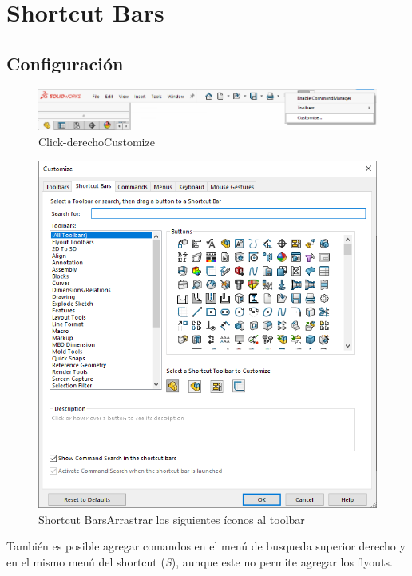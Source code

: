 \documentclass[12pt,letterpaper,final]{report}
\begin{document}
\chapter{Shortcut Bars}

\section{Configuración}

\begin{figure}[H]
	\centering
	\includegraphics[width=0.95\linewidth, height=0.5\textheight,keepaspectratio]{Imagenes/solidworks_shortcutbars_01}
	\caption{Click-derecho\textrightarrow Customize}
	\label{fig:solidworksshortcutbars01}
\end{figure}

\begin{figure}[H]
	\centering
	\includegraphics[width=0.85\linewidth, height=0.5\textheight,keepaspectratio]{Imagenes/solidworks_shortcutbars_02}
	\caption{Shortcut Bars\textrightarrow Arrastrar los siguientes íconos al toolbar}
	\label{fig:solidworksshortcutbars02}
\end{figure}

También es posible agregar comandos en el menú de busqueda superior derecho y en el mismo menú del shortcut (\emph{S}), aunque este no permite agregar los flyouts.
\end{document}
